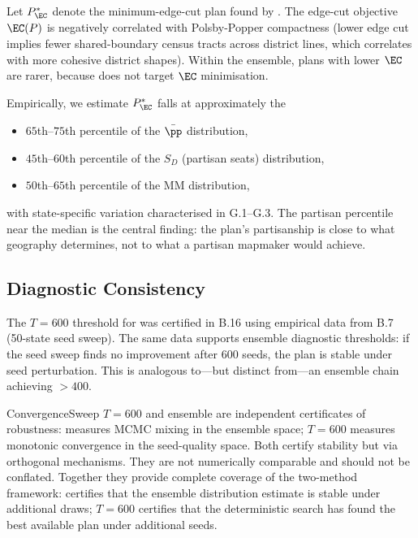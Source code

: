 Let $P^*_{\EC}$ denote the minimum-edge-cut plan found by \cs{}.  The
edge-cut objective $\EC(P)$ is negatively correlated with Polsby-Popper
compactness (lower edge cut implies fewer shared-boundary census tracts
across district lines, which correlates with more cohesive district shapes).
Within the \recom{} ensemble, plans with lower $\EC$ are rarer, because
\recom{} does not target $\EC$ minimisation.

Empirically, we estimate $P^*_{\EC}$ falls at approximately the
\begin{itemize}
  \item $65$th--$75$th percentile of the $\bar\pp$ distribution,
  \item $45$th--$60$th percentile of the $S_D$ (partisan seats) distribution,
  \item $50$th--$65$th percentile of the $\mathrm{MM}$ distribution,
\end{itemize}
with state-specific variation characterised in G.1--G.3.  The partisan
percentile near the median is the central finding: the \ar{} plan's
partisanship is close to what geography determines, not to what a partisan
mapmaker would achieve.

\subsection{Diagnostic Consistency}

The $T = 600$ threshold for \cs{} was certified in B.16 using empirical data
from B.7 (50-state seed sweep).  The same data supports ensemble diagnostic
thresholds: if the seed sweep finds no improvement after 600 seeds, the
plan is stable under seed perturbation.  This is analogous to---but distinct
from---an ensemble chain achieving \ess{} $> 400$.

ConvergenceSweep $T = 600$ and ensemble \ess{} are independent certificates
of robustness: \ess{} measures MCMC mixing in the ensemble space; $T = 600$
measures monotonic convergence in the seed-quality space.  Both certify
stability but via orthogonal mechanisms.  They are not numerically comparable
and should not be conflated.  Together they provide complete coverage of the
two-method framework: \ess{} certifies that the ensemble distribution estimate
is stable under additional draws; $T = 600$ certifies that the deterministic
search has found the best available plan under additional seeds.
